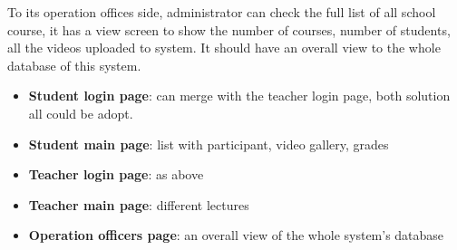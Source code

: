 To its operation offices side, administrator can check the full list of all school course, it has a view screen to show the number of courses, number of students, all the videos uploaded to system. It should have an overall view to the whole database of this system.\\



\begin{itemize}
    \item \textbf{Student login page}: can merge with the teacher login page, both solution all could be adopt. 
    \item \textbf{Student main page}: list with participant, video gallery, grades
    \item \textbf{Teacher login page}: as above
    \item \textbf{Teacher main page}: different lectures
    \item \textbf{Operation officers page}: an overall view of the whole system's database
   
 
\end{itemize}
